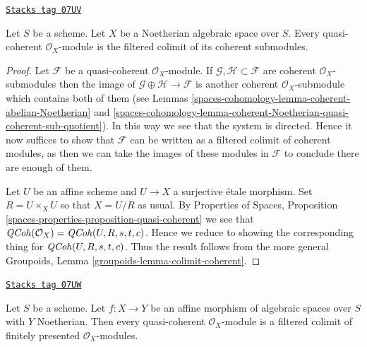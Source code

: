 \begin{lemma}
\label{spaces-cohomology-lemma-directed-colimit-coherent}
\href{https://stacks.math.columbia.edu/tag/07UV}{\texttt{Stacks tag 07UV}}

Let $S$ be a scheme. Let $X$ be a Noetherian algebraic space over $S$.
Every quasi-coherent $\mathcal{O}_X$-module is the filtered colimit
of its coherent submodules.
\end{lemma}

\begin{proof}
Let $\mathcal{F}$ be a quasi-coherent $\mathcal{O}_X$-module.
If $\mathcal{G}, \mathcal{H} \subset \mathcal{F}$ are coherent
$\mathcal{O}_X$-submodules then the image of
$\mathcal{G} \oplus \mathcal{H} \to \mathcal{F}$ is another
coherent $\mathcal{O}_X$-submodule which contains both of them
(see Lemmas \ref{spaces-cohomology-lemma-coherent-abelian-Noetherian} and
\ref{spaces-cohomology-lemma-coherent-Noetherian-quasi-coherent-sub-quotient}).
In this way we see that the system is directed.
Hence it now suffices to show that $\mathcal{F}$ can be written as
a filtered colimit of coherent modules, as then we can take the
images of these modules in $\mathcal{F}$ to conclude there are
enough of them.

\medskip\noindent
Let $U$ be an affine scheme and $U \to X$ a surjective \'etale morphism.
Set $R = U \times_X U$ so that $X = U/R$ as usual. By
Properties of Spaces, Proposition
\ref{spaces-properties-proposition-quasi-coherent}
we see that $\mathit{QCoh}(\mathcal{O}_X) = \mathit{QCoh}(U, R, s, t, c)$.
Hence we reduce to showing the corresponding thing for
$\mathit{QCoh}(U, R, s, t, c)$. Thus the result follows from
the more general Groupoids, Lemma \ref{groupoids-lemma-colimit-coherent}.
\end{proof}

\begin{lemma}
\label{spaces-cohomology-lemma-direct-colimit-finite-presentation}
\href{https://stacks.math.columbia.edu/tag/07UW}{\texttt{Stacks tag 07UW}}

Let $S$ be a scheme. Let $f : X \to Y$ be an affine morphism of algebraic
spaces over $S$ with $Y$ Noetherian. Then every quasi-coherent
$\mathcal{O}_X$-module is a filtered colimit of finitely presented
$\mathcal{O}_X$-modules.
\end{lemma}

